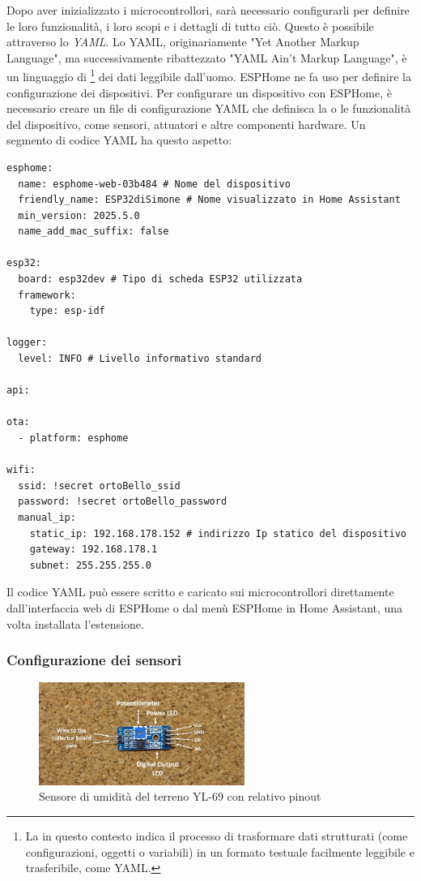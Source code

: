 \documentclass[11pt, a4paper]{article}
\begin{document}
\subsubsection{\secondaFaseHA}
\label{sec:yaml-configurazione}
Dopo aver inizializzato i microcontrollori, sarà necessario configurarli per definire
le loro funzionalità, i loro scopi e i dettagli di tutto ciò. Questo è possibile
attraverso lo \textit{YAML}.
Lo YAML, originariamente "Yet Another Markup Language", ma successivamente ribattezzato
"YAML Ain't Markup Language", è un linguaggio di 
\footnote{La  in questo contesto indica il processo di 
trasformare dati strutturati (come configurazioni, oggetti o variabili) in un 
formato testuale facilmente leggibile e trasferibile, come YAML.} 
dei dati
leggibile dall'uomo. ESPHome ne fa uso per definire la configurazione dei dispositivi.
Per configurare un dispositivo con ESPHome, è necessario creare un file di configurazione
YAML che definisca la o le funzionalità del dispositivo, come sensori, attuatori e altre 
componenti hardware.
Un segmento di codice YAML ha questo aspetto:

\begin{verbatim}
esphome:
  name: esphome-web-03b484 # Nome del dispositivo
  friendly_name: ESP32diSimone # Nome visualizzato in Home Assistant
  min_version: 2025.5.0
  name_add_mac_suffix: false

esp32:
  board: esp32dev # Tipo di scheda ESP32 utilizzata
  framework:
    type: esp-idf

logger:
  level: INFO # Livello informativo standard

api:

ota:
  - platform: esphome

wifi:
  ssid: !secret ortoBello_ssid
  password: !secret ortoBello_password
  manual_ip:
    static_ip: 192.168.178.152 # indirizzo Ip statico del dispositivo
    gateway: 192.168.178.1
    subnet: 255.255.255.0

\end{verbatim}
Il codice YAML può essere scritto e caricato sui microcontrollori direttamente dall'interfaccia
web di ESPHome o dal menù ESPHome in Home Assistant, una volta installata l'estensione.
\subsubsection{Configurazione dei sensori}

\begin{figure}[H]

    \centering
    \includegraphics[width=0.6\textwidth]{media/labeled-sensor.jpeg}
    \caption{Sensore di umidità del terreno YL-69 con relativo pinout}

\end{figure}
\end{document}
